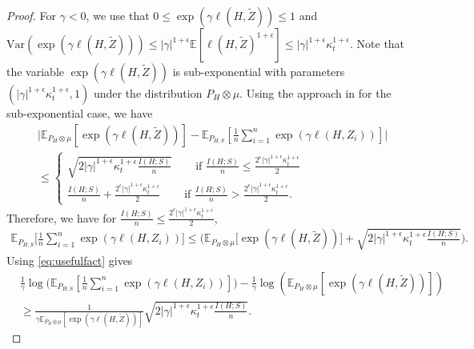 \documentclass{article}
\theoremstyle{plain}
\theoremstyle{plain}
\theoremstyle{definition}
\theoremstyle{remark}
\newcommand{\var}{\mathrm{Var}}
\newcommand{\mbE}{\mathbb{E}}
\begin{document}
\begin{proof}

    For $\gamma<0$, we use that $0\leq\exp(\gamma\ell(H,\tilde Z))\leq 1$ and $\var(\exp(\gamma\ell(H,\tilde Z)))\leq |\gamma|^{1+\epsilon}\mathbb{E}[\ell(H,\tilde Z)^{1+\epsilon}]\leq |\gamma|^{1+\epsilon} \kappa_t^{1+\epsilon}$. Note that the variable $\exp(\gamma\ell(H,\tilde Z))$ is sub-exponential with parameters $(|\gamma|^{1+\epsilon} \kappa_t^{1+\epsilon},1)$ under the distribution $P_H\otimes \mu$. Using the approach in \citep{bu2020tightening,aminian2021exact} for the sub-exponential case, we have 
      \begin{equation}\label{eq: vu}
    \begin{split}
        &\Big|\mbE_{P_{H}\otimes \mu}[ \exp(\gamma \ell(H,\tilde Z))]-\mbE_{P_{H,S}}[\frac{1}{n}\sum_{i=1}^n \exp(\gamma \ell(H,Z_i))]\Big|\\
        &\leq \begin{cases}
            \sqrt{2|\gamma|^{1+\epsilon} \kappa_t^{1+\epsilon}\frac{I(H;S)}{n}}&\quad \mbox{ if } \frac{I(H;S)}{n}\leq \frac{2^{\epsilon}|\gamma|^{1+\epsilon} \kappa_t^{1+\epsilon}}{2}\\
            \frac{I(H;S)}{n}+\frac{2^{\epsilon}|\gamma|^{1+\epsilon} \kappa_t^{1+\epsilon}}{2} & \mbox{ if } \frac{I(H;S)}{n}> \frac{2^{\epsilon}|\gamma|^{1+\epsilon} \kappa_t^{1+\epsilon}}{2}
        .\end{cases}
    \end{split}
    \end{equation}
    Therefore, we have for $\frac{I(H;S)}{n}\leq \frac{2^{\epsilon}|\gamma|^{1+\epsilon} \kappa_t^{1+\epsilon}}{2}$,
    \begin{equation}\label{eq: vu2}
    \begin{split}
        \mbE_{P_{H,S}}\Big[\frac{1}{n}\sum_{i=1}^n \exp(\gamma \ell(H,Z_i))\Big]\leq \Big(\mbE_{P_{H}\otimes \mu}\Big[ \exp(\gamma \ell(H,\tilde Z))\Big]+  \sqrt{2|\gamma|^{1+\epsilon} \kappa_t^{1+\epsilon}\frac{I(H;S)}{n}}\Big).
    \end{split}
    \end{equation}
    Using  \eqref{eq:usefulfact} 
   gives  
     \begin{equation}\label{eq: vu12}
    \begin{split}
        &\frac{1}{\gamma}\log\Big(\mbE_{P_{H,S}}[\frac{1}{n}\sum_{i=1}^n \exp(\gamma \ell(H,Z_i))]\Big)-\frac{1}{\gamma}\log(\mbE_{P_{H}\otimes \mu}[ \exp(\gamma \ell(H,\tilde Z))])\\
        &\geq  \frac{1}{\gamma \mbE_{P_{H}\otimes \mu}[ \exp(\gamma \ell(H,\tilde Z))]} \sqrt{2|\gamma|^{1+\epsilon} \kappa_t^{1+\epsilon}\frac{I(H;S)}{n}}.
    \end{split}
    \end{equation}


\end{proof}
\end{document}
